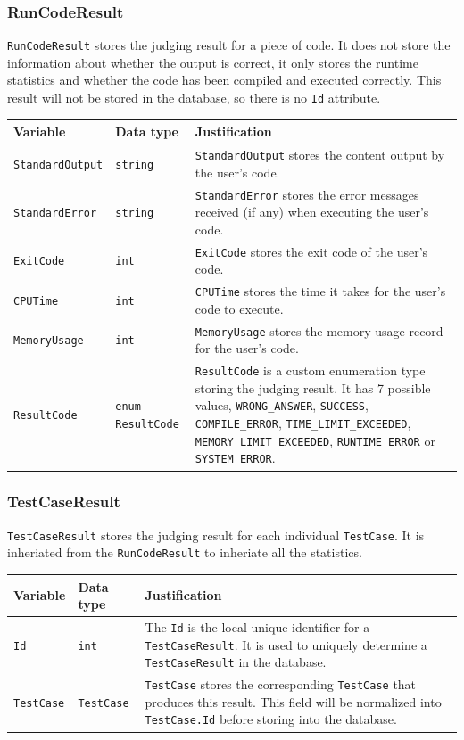 \documentclass[a4paper]{report}
\newcommand{\code}{\texttt}
\begin{document}
\subsubsection{RunCodeResult}

\code{RunCodeResult} stores the judging result for a piece of code. It does not store the information about whether the output is correct, it only stores the runtime statistics and whether the code has been compiled and executed correctly. This result will not be stored in the database, so there is no \code{Id} attribute.

\begin{tabulary}{\textwidth}{|l|l|L|}
    \hline
    Variable & Data type & Justification \\
    \hline
    \code{StandardOutput} & \code{string} & \code{StandardOutput} stores the content output by the user's code. \\
    \hline
    \code{StandardError} & \code{string} & \code{StandardError} stores the error messages received (if any) when executing the user's code. \\
    \hline
    \code{ExitCode} & \code{int} & \code{ExitCode} stores the exit code of the user's code. \\
    \hline
    \code{CPUTime} & \code{int} & \code{CPUTime} stores the time it takes for the user's code to execute. \\
    \hline
    \code{MemoryUsage} & \code{int} & \code{MemoryUsage} stores the memory usage record for the user's code. \\
    \hline
    \code{ResultCode} & \code{enum ResultCode} & \code{ResultCode} is a custom enumeration type storing the judging result. It has 7 possible values, \code{WRONG_ANSWER}, \code{SUCCESS}, \code{COMPILE_ERROR}, \code{TIME_LIMIT_EXCEEDED}, \code{MEMORY_LIMIT_EXCEEDED}, \code{RUNTIME_ERROR} or \code{SYSTEM_ERROR}. \\
    \hline
\end{tabulary}

\subsubsection{TestCaseResult}

\code{TestCaseResult} stores the judging result for each individual \code{TestCase}. It is inheriated from the \code{RunCodeResult} to inheriate all the statistics.

\begin{tabulary}{\textwidth}{|l|l|L|}
    \hline
    Variable & Data type & Justification \\
    \hline
    \code{Id} & \code{int} & The \code{Id} is the local unique identifier for a \code{TestCaseResult}. It is used to uniquely determine a \code{TestCaseResult} in the database. \\
    \hline
    \code{TestCase} & \code{TestCase} & \code{TestCase} stores the corresponding \code{TestCase} that produces this result. This field will be normalized into \code{TestCase.Id} before storing into the database. \\
    \hline
\end{tabulary}
\end{document}
